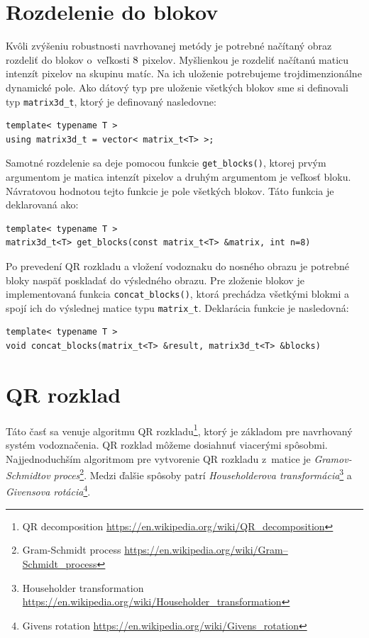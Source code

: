 \section{Rozdelenie do blokov}
\label{impl:divide}
Kvôli zvýšeniu robustnosti navrhovanej metódy je potrebné načítaný obraz rozdeliť do blokov o~veľkosti $8\time8$ pixelov. Myšlienkou je rozdeliť načítanú maticu intenzít pixelov na skupinu matíc. Na ich uloženie potrebujeme trojdimenzionálne dynamické pole. Ako dátový typ pre uloženie všetkých blokov sme si definovali typ {\tt matrix3d\_t}, ktorý je definovaný nasledovne:
\begin{lstlisting}
template< typename T >
using matrix3d_t = vector< matrix_t<T> >;
\end{lstlisting}

Samotné rozdelenie sa deje pomocou funkcie {\tt get\_blocks()}, ktorej prvým argumentom je matica intenzít pixelov a druhým argumentom je veľkosť bloku. Návratovou hodnotou tejto funkcie je pole všetkých blokov. Táto funkcia je deklarovaná ako:
\begin{lstlisting}
template< typename T >
matrix3d_t<T> get_blocks(const matrix_t<T> &matrix, int n=8)
\end{lstlisting}

Po prevedení QR rozkladu a vložení vodoznaku do nosného obrazu je potrebné bloky naspäť poskladať do výsledného obrazu. Pre zloženie blokov je implementovaná funkcia {\tt concat\_blocks()}, ktorá prechádza všetkými blokmi a spojí ich do výslednej matice typu {\tt matrix\_t}. Deklarácia funkcie je nasledovná:
\begin{lstlisting}
template< typename T >
void concat_blocks(matrix_t<T> &result, matrix3d_t<T> &blocks)
\end{lstlisting}

\section{QR rozklad}
\label{impl:qr}
Táto časť sa venuje algoritmu QR rozkladu\footnote{QR decomposition \url{https://en.wikipedia.org/wiki/QR_decomposition}}, ktorý je základom pre navrhovaný systém vodoznačenia. QR rozklad môžeme dosiahnuť viacerými spôsobmi. Najjednoduchším algoritmom pre vytvorenie QR rozkladu z~matice je {\it Gramov-Schmidtov proces}\footnote{Gram-Schmidt process \url{https://en.wikipedia.org/wiki/Gram–Schmidt_process}}. Medzi ďalšie spôsoby patrí {\it Householderova transformácia}\footnote{Householder transformation \url{https://en.wikipedia.org/wiki/Householder_transformation}} a {\it Givensova rotácia}\footnote{Givens rotation \url{https://en.wikipedia.org/wiki/Givens_rotation}}.

